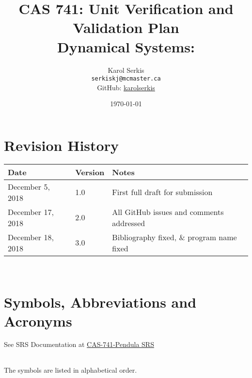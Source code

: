 \documentclass[12pt, titlepage]{article}
\begin{document}
\title{CAS 741: Unit Verification and Validation Plan\\[10pt]
\Large Dynamical Systems: \progname}
\author{Karol Serkis\\\texttt{serkiskj@mcmaster.ca}\\GitHub:
\href{https://www.github.com/karolserkis}{karolserkis}}
\date{\today}
	
\maketitle


\section{Revision History}

\begin{tabularx}{\textwidth}{p{4cm}p{2cm}X}
\toprule {\bf Date} & {\bf Version} & {\bf Notes}\\
\midrule
December 5, 2018 & 1.0 &  First full draft for submission\\
December 17, 2018 & 2.0 & All GitHub issues and comments addressed \\
December 18, 2018 & 3.0 & Bibliography fixed, 
\& program name fixed \\
\bottomrule
\end{tabularx}

~\newpage

\section{Symbols, Abbreviations and Acronyms}

See SRS Documentation at 
\href{https://github.com/karolserkis/CAS-741-Pendula/blob/master/docs/SRS/SRS.pdf}{CAS-741-Pendula SRS}
 

\\
The symbols are listed in alphabetical order.\\
\end{document}
